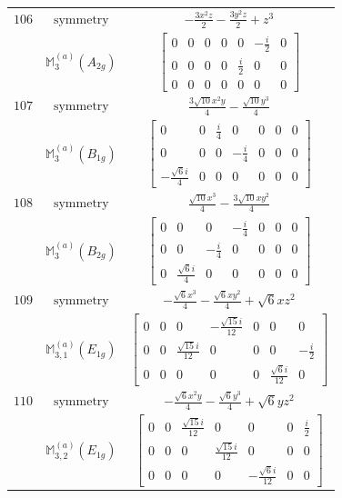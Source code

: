 \documentclass[fleqn,8pt,landscape]{jsarticle}
\begin{document}
\begin{longtable}{ccc}
$ 106 $ & $ \text{symmetry} $ & $ - \frac{3 x^{2} z}{2} - \frac{3 y^{2} z}{2} + z^{3} $ \\
$  $ & $ \mathbb{M}_{3}^{(a)}(A_{2g}) $ & $ \begin{bmatrix} 0 & 0 & 0 & 0 & 0 & - \frac{i}{2} & 0 \\ 0 & 0 & 0 & 0 & \frac{i}{2} & 0 & 0 \\ 0 & 0 & 0 & 0 & 0 & 0 & 0 \end{bmatrix} $ \\ \hline
$ 107 $ & $ \text{symmetry} $ & $ \frac{3 \sqrt{10} x^{2} y}{4} - \frac{\sqrt{10} y^{3}}{4} $ \\
$  $ & $ \mathbb{M}_{3}^{(a)}(B_{1g}) $ & $ \begin{bmatrix} 0 & 0 & \frac{i}{4} & 0 & 0 & 0 & 0 \\ 0 & 0 & 0 & - \frac{i}{4} & 0 & 0 & 0 \\ - \frac{\sqrt{6} i}{4} & 0 & 0 & 0 & 0 & 0 & 0 \end{bmatrix} $ \\ \hline
$ 108 $ & $ \text{symmetry} $ & $ \frac{\sqrt{10} x^{3}}{4} - \frac{3 \sqrt{10} x y^{2}}{4} $ \\
$  $ & $ \mathbb{M}_{3}^{(a)}(B_{2g}) $ & $ \begin{bmatrix} 0 & 0 & 0 & - \frac{i}{4} & 0 & 0 & 0 \\ 0 & 0 & - \frac{i}{4} & 0 & 0 & 0 & 0 \\ 0 & \frac{\sqrt{6} i}{4} & 0 & 0 & 0 & 0 & 0 \end{bmatrix} $ \\ \hline
$ 109 $ & $ \text{symmetry} $ & $ - \frac{\sqrt{6} x^{3}}{4} - \frac{\sqrt{6} x y^{2}}{4} + \sqrt{6} x z^{2} $ \\
$  $ & $ \mathbb{M}_{3,1}^{(a)}(E_{1g}) $ & $ \begin{bmatrix} 0 & 0 & 0 & - \frac{\sqrt{15} i}{12} & 0 & 0 & 0 \\ 0 & 0 & \frac{\sqrt{15} i}{12} & 0 & 0 & 0 & - \frac{i}{2} \\ 0 & 0 & 0 & 0 & 0 & \frac{\sqrt{6} i}{12} & 0 \end{bmatrix} $ \\ \hline
$ 110 $ & $ \text{symmetry} $ & $ - \frac{\sqrt{6} x^{2} y}{4} - \frac{\sqrt{6} y^{3}}{4} + \sqrt{6} y z^{2} $ \\
$  $ & $ \mathbb{M}_{3,2}^{(a)}(E_{1g}) $ & $ \begin{bmatrix} 0 & 0 & \frac{\sqrt{15} i}{12} & 0 & 0 & 0 & \frac{i}{2} \\ 0 & 0 & 0 & \frac{\sqrt{15} i}{12} & 0 & 0 & 0 \\ 0 & 0 & 0 & 0 & - \frac{\sqrt{6} i}{12} & 0 & 0 \end{bmatrix} $ \\ \hline

\end{longtable}
\end{document}

